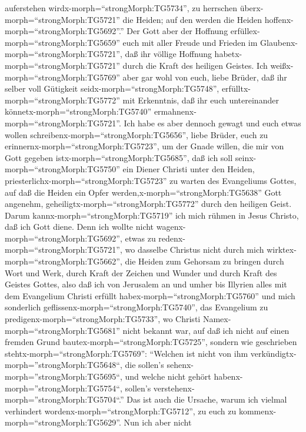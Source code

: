 auferstehen wirdx-morph=``strongMorph:TG5734'', zu herrschen
überx-morph=``strongMorph:TG5721'' die Heiden; auf den werden die Heiden
hoffenx-morph=``strongMorph:TG5692''.''  Der Gott aber der
Hoffnung erfüllex-morph=``strongMorph:TG5659'' euch mit aller Freude und
Frieden im Glaubenx-morph=``strongMorph:TG5721'', daß ihr völlige
Hoffnung habetx-morph=``strongMorph:TG5721'' durch die Kraft des
heiligen Geistes.  Ich weißx-morph=``strongMorph:TG5769''
aber gar wohl von euch, liebe Brüder, daß ihr selber voll Gütigkeit
seidx-morph=``strongMorph:TG5748'',
erfülltx-morph=``strongMorph:TG5772'' mit Erkenntnis, daß ihr euch
untereinander könnetx-morph=``strongMorph:TG5740''
ermahnenx-morph=``strongMorph:TG5721''.  Ich habe es aber
dennoch gewagt und euch etwas wollen
schreibenx-morph=``strongMorph:TG5656'', liebe Brüder, euch zu
erinnernx-morph=``strongMorph:TG5723'', um der Gnade willen, die mir von
Gott gegeben istx-morph=``strongMorph:TG5685'',  daß ich
soll seinx-morph=``strongMorph:TG5750'' ein Diener Christi unter den
Heiden, priesterlichx-morph=``strongMorph:TG5723'' zu warten des
Evangeliums Gottes, auf daß die Heiden ein Opfer
werden,x-morph=``strongMorph:TG5638'' Gott angenehm,
geheiligtx-morph=``strongMorph:TG5772'' durch den heiligen Geist.
 Darum kannx-morph=``strongMorph:TG5719'' ich mich rühmen
in Jesus Christo, daß ich Gott diene.  Denn ich wollte
nicht wagenx-morph=``strongMorph:TG5692'', etwas zu
redenx-morph=``strongMorph:TG5721'', wo dasselbe Christus nicht durch
mich wirktex-morph=``strongMorph:TG5662'', die Heiden zum Gehorsam zu
bringen durch Wort und Werk,  durch Kraft der Zeichen und
Wunder und durch Kraft des Geistes Gottes, also daß ich von Jerusalem an
und umher bis Illyrien alles mit dem Evangelium Christi erfüllt
habex-morph=``strongMorph:TG5760''  und mich sonderlich
geflissenx-morph=``strongMorph:TG5740'', das Evangelium zu
predigenx-morph=``strongMorph:TG5733'', wo Christi
Namex-morph=``strongMorph:TG5681'' nicht bekannt war, auf daß ich nicht
auf einen fremden Grund bautex-morph=``strongMorph:TG5725'',
 sondern wie geschrieben
stehtx-morph=``strongMorph:TG5769'': ``Welchen ist nicht von ihm
verkündigtx-morph=''strongMorph:TG5648``, die sollen's
sehenx-morph=''strongMorph:TG5695``, und welche nicht gehört
habenx-morph=''strongMorph:TG5754``, sollen's
verstehenx-morph=''strongMorph:TG5704``.''  Das ist auch
die Ursache, warum ich vielmal verhindert
wordenx-morph=``strongMorph:TG5712'', zu euch zu
kommenx-morph=``strongMorph:TG5629''.  Nun ich aber nicht
